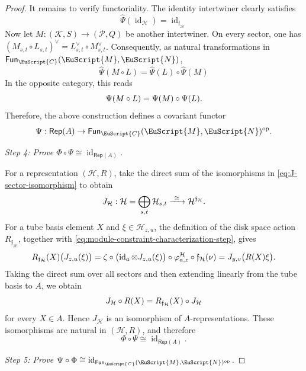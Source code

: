 \documentclass[a4paper,11pt]{article}
\theoremstyle{definition}
\theoremstyle{remark}
\newcommand\eC           {\EuScript{C}}
\newcommand\eM          {\EuScript{M}}
\newcommand\eN         {\EuScript{N}}
\newcommand{\Rep}{\mathsf{Rep}}
\newcommand{\id}{\operatorname{id}}
\newcommand{\Fun}{\mathsf{Fun}}
\begin{document}
\begin{proof}
It remains to verify functoriality. The identity intertwiner clearly satisfies 
\[
    \widehat{\Psi}(\id_{\mathcal H}) = \id_{\mathfrak f_{\mathcal H}} 
\]
Now let $M:(\mathcal K,S)\to(\mathcal P,Q)$ be another intertwiner. On every sector, one has $(M_{s,t}\circ L_{s,t})^{\vee} = L_{s,t}^{\vee}\circ M_{s,t}^{\vee}$. Consequently, as natural transformations in
$\Fun_{\eC}(\eM,\eN)$, 
\[
    \widehat{\Psi}(M\circ L) = \widehat{\Psi}(L) \circ \widehat{\Psi}(M)
\]
In the opposite category, this reads 
\begin{equation}
    \notag
    \Psi(M\circ L)
    =
    \Psi(M)\circ\Psi(L).
\end{equation}
Therefore, the above construction defines a covariant functor
\begin{equation}
    \notag
    \Psi:
    \Rep(A)
    \to
    \Fun_{\eC}(\eM,\eN)^{\rm op}.
\end{equation}

\smallskip
\textit{Step 4: Prove $\Phi\circ\Psi\cong\id_{\Rep(A)}$.}

For a representation $(\mathcal H,R)$, take the direct sum of the isomorphisms in \eqref{eq:J-sector-isomorphism} to obtain
\begin{equation}
    \notag
    J_{\mathcal H}:
    \mathcal H
    =
    \bigoplus_{s,t}\mathcal H_{s,t}
    \xrightarrow{\ \simeq\ }
    \mathcal H^{\mathfrak{f}_{\mathcal H}}.
\end{equation}
For a tube basis element $X$ and $\xi\in\mathcal H_{z,u}$, the definition of the disk space action
$R_{\mathfrak f_{\mathcal H}}$, together with \eqref{eq:module-constraint-characterization-step}, gives
\begin{equation}
    \notag
        R_{\mathfrak f_{\mathcal H}}(X)
        \bigl(J_{z,u}(\xi)\bigr) = \zeta \circ \bigl(\id_a\otimes J_{z,u}(\xi)\bigr)\circ
        \varphi^{\mathcal H}_{a,z}\circ\mathfrak f_{\mathcal H}(\nu) = J_{y,v}\bigl(R(X)\xi\bigr).
\end{equation}
Taking the direct sum over all sectors and then extending linearly from the tube basis to $A$, we obtain
\begin{equation}
    \notag
    J_{\mathcal H}\circ R(X)
    =
    R_{\mathfrak f_{\mathcal H}}(X)
    \circ J_{\mathcal H}
\end{equation}
for every $X\in A$. Hence $J_{\mathcal H}$ is an isomorphism of $A$-representations.  These isomorphisms are natural in $(\mathcal H,R)$, and therefore
\[
    \Phi\circ\Psi\cong\id_{\Rep(A)}.
\]

\smallskip
\textit{Step 5: Prove $\Psi\circ\Phi\cong\id_{\Fun_{\eC}(\eM,\eN)^{\rm op}}$.}


\end{proof}
\end{document}
